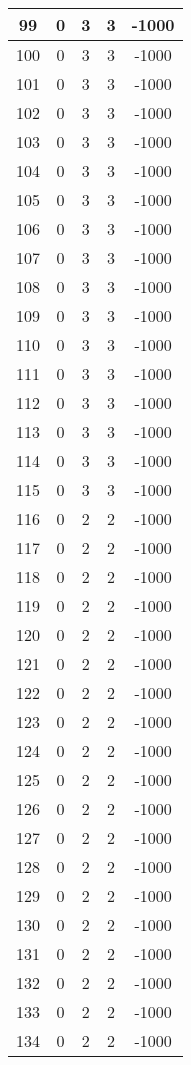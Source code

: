 \documentclass[letterpaper, 12pt]{article}
\begin{document}
\begin{longtable}{|c|c|c|c|c|}
\hline
99 & 0 & 3 & 3 & -1000 \\
\hline
100 & 0 & 3 & 3 & -1000 \\
\hline
101 & 0 & 3 & 3 & -1000 \\
\hline
102 & 0 & 3 & 3 & -1000 \\
\hline
103 & 0 & 3 & 3 & -1000 \\
\hline
104 & 0 & 3 & 3 & -1000 \\
\hline
105 & 0 & 3 & 3 & -1000 \\
\hline
106 & 0 & 3 & 3 & -1000 \\
\hline
107 & 0 & 3 & 3 & -1000 \\
\hline
108 & 0 & 3 & 3 & -1000 \\
\hline
109 & 0 & 3 & 3 & -1000 \\
\hline
110 & 0 & 3 & 3 & -1000 \\
\hline
111 & 0 & 3 & 3 & -1000 \\
\hline
112 & 0 & 3 & 3 & -1000 \\
\hline
113 & 0 & 3 & 3 & -1000 \\
\hline
114 & 0 & 3 & 3 & -1000 \\
\hline
115 & 0 & 3 & 3 & -1000 \\
\hline
116 & 0 & 2 & 2 & -1000 \\
\hline
117 & 0 & 2 & 2 & -1000 \\
\hline
118 & 0 & 2 & 2 & -1000 \\
\hline
119 & 0 & 2 & 2 & -1000 \\
\hline
120 & 0 & 2 & 2 & -1000 \\
\hline
121 & 0 & 2 & 2 & -1000 \\
\hline
122 & 0 & 2 & 2 & -1000 \\
\hline
123 & 0 & 2 & 2 & -1000 \\
\hline
124 & 0 & 2 & 2 & -1000 \\
\hline
125 & 0 & 2 & 2 & -1000 \\
\hline
126 & 0 & 2 & 2 & -1000 \\
\hline
127 & 0 & 2 & 2 & -1000 \\
\hline
128 & 0 & 2 & 2 & -1000 \\
\hline
129 & 0 & 2 & 2 & -1000 \\
\hline
130 & 0 & 2 & 2 & -1000 \\
\hline
131 & 0 & 2 & 2 & -1000 \\
\hline
132 & 0 & 2 & 2 & -1000 \\
\hline
133 & 0 & 2 & 2 & -1000 \\
\hline
134 & 0 & 2 & 2 & -1000 \\

\end{longtable}
\end{document}
